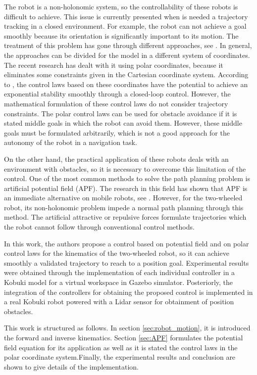 \documentclass[conference]{IEEEtran}
\begin{document}
The robot is a non-holonomic system, so the controllability of these robots is difficult to achieve. This issue is currently presented when is needed a trajectory tracking in a closed environment. For example, the robot can not achieve a goal smoothly because its orientation is significantly important to its motion. The treatment of this problem has gone through different approaches, see \cite{Rubayat}. In general, the approaches can be divided for the model in a different system of coordinates. The recent research has dealt with it using polar coordinates, because it eliminates some constraints given in the Cartesian coordinate system. According to \cite{Matoui}, the control laws based on these coordinates have the potential to achieve an exponential stability smoothly through a closed-loop control. However, the mathematical formulation of these control laws do not consider trajectory constraints. The polar control laws can be used for obstacle avoidance if it is stated middle goals in which the robot can avoid them. However, these middle goals must be formulated arbitrarily, which is not a good approach for the autonomy of the robot in a navigation task.

On the other hand, the practical application of these robots deals with an environment with obstacles, so it is necessary to overcome this limitation of the control.  One of the most common methods to solve the path planning problem is artificial potential field (APF). The research in this field has shown that APF is an immediate alternative on mobile robots, see \cite{Woods}. However, for the two-wheeled robot, its non-holonomic problem impede a normal path planning through this method. The artificial attractive or repulsive forces formulate trajectories which the robot cannot follow through conventional control methods. 

In this work, the authors propose a control based on potential field and on polar control laws for the kinematics of the two-wheeled robot, so it can achieve smoothly a validated trajectory to reach to a position goal. Experimental results were obtained through the implementation of each individual controller in a Kobuki model for a virtual workspace in Gazebo simulator. Posteriorly, the integration of the controllers for obtaining the proposed control is implemented in a real Kobuki robot powered with a Lidar sensor for obtainment of position obstacles. 
 
This work is structured as follows. In section \ref{sec:robot_motion}, it is introduced the forward and inverse kinematics. Section  \ref{sec:APF} formulates the potential field equation for its application as well as it is stated the control laws in the polar coordinate system.Finally, the experimental results and conclusion are shown to give details of the implementation.
\end{document}
